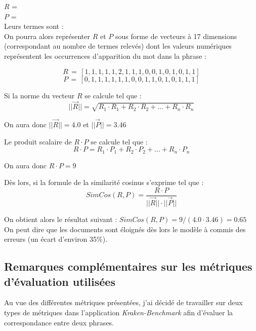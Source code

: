 $R$ = \\

$P$ = \\

Leurs termes sont : \\

On pourra alors représenter $R$ et $P$ sous forme de vecteurs à 17 dimensions (correspondant au nombre de termes relevés) dont les valeurs numériques représentent les occurrences d'apparition du mot dans la phrase :

$$R\,=\,[1,1,1,1,1,2,1,1,1,0,0,1,0,1,0,1,1]$$
$$P\,=\,[0,1,1,1,1,1,1,0,0,1,1,0,1,0,1,1,1]$$

Si la norme du vecteur $R$ se calcule tel que : $$||\overrightarrow{R}|| = \sqrt{R_1 \cdot R_1 + R_2 \cdot R_2 + \ldots + R_n \cdot R_n}$$

On aura donc $||\overrightarrow{R}|| = 4.0 $ et $||\overrightarrow{P}|| = 3.46 $

Le produit scalaire de $R \cdot P$ se calcule tel que : $$R \cdot P = R_1 \cdot P_1 + R_2 \cdot P_2 + \ldots + R_n \cdot P_n$$

On aura donc $R \cdot P = 9$

Dès lors, si la formule de la similarité cosinus s'exprime tel que : $$SimCos(R,P) = \frac{R \cdot P}{||\overrightarrow{R}|| \cdot ||\overrightarrow{P}||}$$

On obtient alors le résultat suivant : $SimCos(R,P) = 9 / (4.0 \cdot 3.46) = 0.65$ \\ On peut dire que les documents sont éloignés dès lors le modèle à commis des erreurs (un écart d'environ 35\%).

\subsection{Remarques complémentaires sur les métriques d'évaluation utilisées}

Au vue des différentes métriques présentées, j'ai décidé de travailler sur deux types de métriques dans l'application \textit{Kraken-Benchmark} afin d'évaluer la correspondance entre deux phrases.


